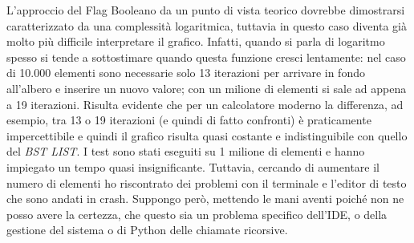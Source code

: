 \documentclass{article}
\begin{document}
\begin{minipage}[t]{\linewidth}
\begin{multicols}{2}
\begin{minipage}{\linewidth}
    \centering
    \label{tab:bst-insertion-summarised}
\end{minipage}
\columnbreak
\begin{minipage}{\linewidth}
    \centering
    \label{tab:bst-insertion-summarised}
\end{minipage}
\end{multicols}
\end{minipage}
\vspace{15px}




\vspace{15px}

L'approccio del Flag Booleano da un punto di vista teorico dovrebbe dimostrarsi caratterizzato da una complessità logaritmica, tuttavia in questo caso diventa già molto più difficile interpretare il grafico.
Infatti, quando si parla di logaritmo spesso si tende a sottostimare quando questa funzione cresci lentamente: nel caso di   10.000 elementi sono necessarie solo 13 iterazioni per arrivare in fondo all'albero e inserire un nuovo valore; con un milione di elementi si sale ad appena a 19 iterazioni. Risulta evidente che per un calcolatore moderno la differenza, ad esempio, tra 13 o 19 iterazioni (e quindi di fatto confronti) è praticamente impercettibile e quindi il grafico risulta quasi costante e indistinguibile con quello del \textit{BST LIST}.
I test sono stati eseguiti su 1 milione di elementi e hanno impiegato un tempo quasi insignificante. Tuttavia, cercando di aumentare il numero di elementi ho riscontrato dei problemi con il terminale e l'editor di testo che sono andati in crash. Suppongo però, mettendo le mani aventi poiché non ne posso avere la certezza, che questo sia un problema specifico dell'IDE, o della gestione del sistema o di Python delle chiamate ricorsive.
\end{document}
